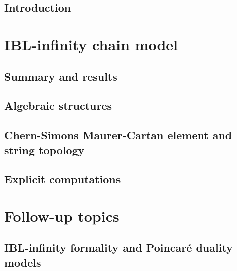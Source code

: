 \documentclass[11pt,
a4paper,
oneside, %
openright, %
cleardoublepage=plain, %
final
]{scrbook}
\providecommand{\MainFolder}{.} %
\providecommand{\SubfilesFolder}{\MainFolder/Subfiles} %
\begin{document}
%
\chapter{Introduction}



\part{IBL-infinity chain model}
%
\chapter{Summary and results}



\chapter{Algebraic structures}







\chapter{Chern-Simons Maurer-Cartan element and string topology}









\chapter{Explicit computations}






\part{Follow-up topics}

\chapter{IBL-infinity formality and Poincar\'e duality models}\label{Chap:5}
\end{document}
